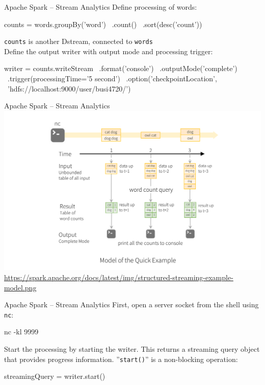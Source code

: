 \documentclass[ignorenonframetext,xcolor=x11names]{beamer}
\begin{document}
\begin{frame}[fragile]{Apache Spark -- Stream Analytics}
Define processing of words:
\begin{pythoncode}
counts = words.groupBy('word') \
              .count() \
              .sort(desc('count'))
\end{pythoncode}
\texttt{counts} is another Dstream, connected to \texttt{words} \\

Define the output writer with output mode and processing trigger:
\begin{pythoncode}
writer = counts.writeStream \
           .format('console') \
           .outputMode('complete') \
           .trigger(processingTime='5 second') \
           .option('checkpointLocation', \
               'hdfs://localhost:9000/user/busi4720/')
\end{pythoncode}
\end{frame}

\begin{frame}{Apache Spark -- Stream Analytics}
\includegraphics[width=\textwidth]{structured-streaming-example-model.png} \\

\scriptsize\url{https://spark.apache.org/docs/latest/img/structured-streaming-example-model.png}
\end{frame}

\begin{frame}[fragile]{Apache Spark -- Stream Analytics}
First, open a server socket from the shell using \texttt{nc}:
\begin{bashcode}
nc -kl 9999
\end{bashcode}
Start the processing by starting the writer. This returns a streaming query object that provides progress information. ''\texttt{start()}'' is a non-blocking operation:
\begin{pythoncode}
streamingQuery = writer.start()
\end{pythoncode}
\end{frame}
\end{document}
